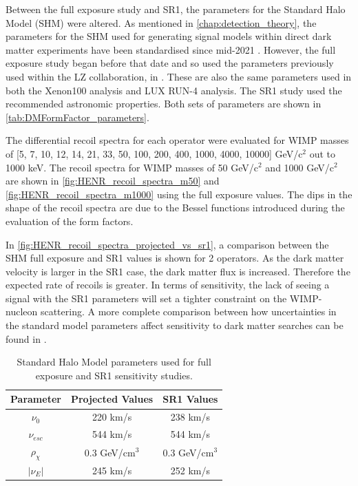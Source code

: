 \par
Between the full exposure study and SR1, the parameters for the Standard Halo Model (SHM) were altered.
As mentioned in \autoref{chap:detection_theory}, the parameters for the SHM used for generating signal models within direct dark matter experiments have been standardised since mid-2021 \cite{standard_halo_model_conventions_ref}.
However, the full exposure study began before that date and so used the parameters previously used within the LZ collaboration, in \cite{LZ_projected_sensitivity_paper_ref,LZ_TechnicalDesignReview_ref,LZ_Ibles_LZStats_Thesis_ref}.
These are also the same parameters used in both the Xenon100 analysis and LUX RUN-4 analysis.
The SR1 study used the recommended astronomic properties.
Both sets of parameters are shown in \autoref{tab:DMFormFactor_parameters}.

\par
The differential recoil spectra for each operator were evaluated for WIMP masses of [5, 7, 10, 12, 14, 21, 33, 50, 100, 200, 400, 1000, 4000, 10000] GeV/c$^{2}$ out to 1000 keV.
The recoil spectra for WIMP masses of 50 GeV/c$^2$ and 1000 GeV/c$^2$ are shown in \autoref{fig:HENR_recoil_spectra_m50} and \autoref{fig:HENR_recoil_spectra_m1000} using the full exposure values.
The dips in the shape of the recoil spectra are due to the Bessel functions introduced during the evaluation of the form factors.

\par
In \autoref{fig:HENR_recoil_spectra_projected_vs_sr1}, a comparison between the SHM full exposure and SR1 values is shown for 2 operators.
As the dark matter velocity is larger in the SR1 case, the dark matter flux is increased.
Therefore the expected rate of recoils is greater.
In terms of sensitivity, the lack of seeing a signal with the SR1 parameters will set a tighter constraint on the WIMP-nucleon scattering.
A more complete comparison between how uncertainties in the standard model parameters affect sensitivity to dark matter searches can be found in \cite{LZ_Ibles_LZStats_Thesis_ref,billyboxer_thesis_ref}.

\begin{table}[]
    \centering
    \begin{tabular}{c|c|c}
        Parameter         & Projected Values   & SR1 Values       \\ \hline
        $\nu_0$           & 220 km/s           & 238 km/s         \\ 
        $\nu_{esc}$       & 544 km/s           & 544 km/s         \\
        $\rho_{\chi}$     & 0.3 GeV/cm$^{3}$   & 0.3 GeV/cm$^{3}$ \\
        $|\nu_E|$         & 245 km/s           & 252 km/s  
    \end{tabular}
    \caption{Standard Halo Model parameters used for full exposure and SR1 sensitivity studies.}
    \label{tab:DMFormFactor_parameters}
\end{table}


